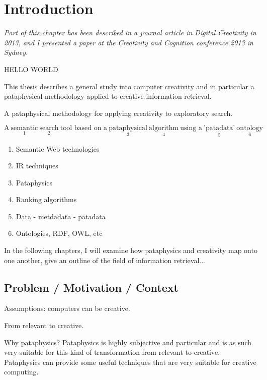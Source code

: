 
\chapter{Introduction}
\label{ch:intro}

\emph{Part of this chapter has been described in a journal article in Digital Creativity in 2013, and I presented a paper at the Creativity and Cognition conference 2013 in Sydney.} 

\grule

{\color{red} HELLO WORLD}%

This thesis describes a general study into computer creativity and in particular a pataphysical methodology applied to creative information retrieval.

A pataphysical methodology for applying creativity to exploratory search.

$\text{A} \ \underset{1}{\text{semantic}} \ \underset{2}{\text{search}} \ \text{tool based on a} \ \underset{3}{\text{pataphysical}} \ \underset{4}{\text{algorithm}} \ \text{using a} \ \underset{5}{\text{'patadata'}} \ \underset{6}{\text{ontology}}$

\begin{enumerate}
  \item Semantic Web technologies
  \item IR techniques
  \item Pataphysics
  \item Ranking algorithms
  \item Data - metdadata - patadata
  \item Ontologies, RDF, OWL, etc
\end{enumerate}


In the following chapters, I will examine how pataphysics and creativity map onto one another, give an outline of the field of information retrieval...

\section{Problem / Motivation / Context}

Assumptions: computers can be creative.

From relevant to creative.

Why pataphysics?
Pataphysics is highly subjective and particular and is as such very suitable for this kind of transformation from relevant to creative.
Pataphysics can provide some useful techniques that are very suitable for creative computing.

